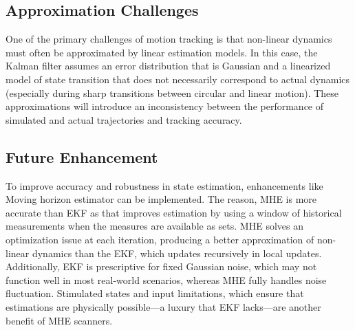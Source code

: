 \documentclass[a4paper,11pt]{article}
\begin{document}
\subsection*{Approximation Challenges}
One of the primary challenges of motion tracking is that non-linear dynamics must often be approximated by linear estimation models. In this case, the Kalman filter assumes an error distribution that is Gaussian and a linearized model of state transition that does not necessarily correspond to actual dynamics (especially during sharp transitions between circular and linear motion). These approximations will introduce an inconsistency between the performance of simulated and actual trajectories and tracking accuracy. 

\subsection*{Future Enhancement}
To improve accuracy and robustness in state estimation, enhancements like Moving horizon estimator can be implemented. The reason, MHE is more accurate than EKF as that improves estimation by using a window of historical measurements when the measures are available as sets. MHE solves an optimization issue at each iteration, producing a better approximation of non-linear dynamics than the EKF, which updates recursively in local updates. Additionally, EKF is prescriptive for fixed Gaussian noise, which may not function well in most real-world scenarios, whereas MHE fully handles noise fluctuation. Stimulated states and input limitations, which ensure that estimations are physically possible—a luxury that EKF lacks—are another benefit of MHE scanners. 
\end{document}
